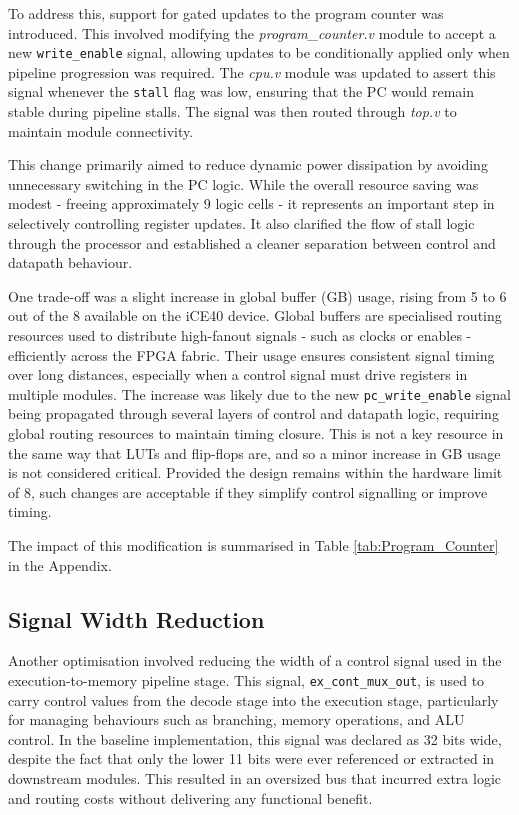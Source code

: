 \documentclass[a4paper,10pt]{article}
\begin{document}
To address this, support for gated updates to the program counter was introduced. 
This involved modifying the \textit{program\_counter.v} module to accept 
a new \texttt{write\_enable} signal, 
allowing updates to be conditionally applied only when 
pipeline progression was required. 
The \textit{cpu.v} module was updated to assert this signal whenever 
the \texttt{stall} flag was low, 
ensuring that the PC would remain stable during pipeline stalls. 
The signal was then routed through \textit{top.v} to maintain module connectivity.

This change primarily aimed to reduce dynamic power dissipation by 
avoiding unnecessary switching in the PC logic. 
While the overall resource saving was modest - 
freeing approximately 9 logic cells - 
it represents an important step in selectively controlling register updates. 
It also clarified the flow of stall logic through the processor 
and established a cleaner separation between control and datapath behaviour. 

One trade-off was a slight increase in global buffer (GB) usage, 
rising from 5 to 6 out of the 8 available on the iCE40 device. 
Global buffers are specialised routing resources used to 
distribute high-fanout signals - 
such as clocks or enables - efficiently across the FPGA fabric. 
Their usage ensures consistent signal timing over long distances, 
especially when a control signal must drive registers in multiple modules. 
The increase was likely due to the new 
\texttt{pc\_write\_enable} signal being propagated through 
several layers of control and datapath logic, 
requiring global routing resources to maintain timing closure.
This is not a key resource in the same way that LUTs and flip-flops are, 
and so a minor increase in GB usage is not considered critical. 
Provided the design remains within the hardware limit of 8, 
such changes are acceptable if they simplify control signalling or improve timing.

The impact of this modification is 
summarised in Table \ref{tab:Program_Counter} in the Appendix.

\subsection{Signal Width Reduction}
\label{sec:Signal_Width}

Another optimisation involved reducing the width of a control signal used in 
the execution-to-memory pipeline stage. 
This signal, \texttt{ex\_cont\_mux\_out}, 
is used to carry control values from the decode 
stage into the execution stage, 
particularly for managing behaviours such as branching, memory operations, and ALU control. 
In the baseline implementation, this signal was declared as 32 bits wide, 
despite the fact that only the lower 11 bits 
were ever referenced or extracted in downstream modules. 
This resulted in an oversized bus that incurred extra logic and routing 
costs without delivering any functional benefit.
\end{document}
